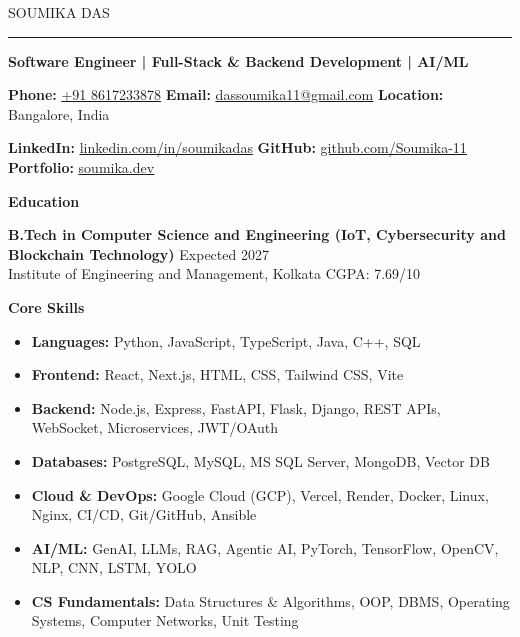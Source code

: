 \documentclass[10pt,a4paper]{article}
\newcommand{\heading}[1]{{\carlito #1}}
\newcommand{\cvsection}[1]{%
  \par\vspace{10pt}%
  {\heading{\color{sectioncolor}\large\bfseries #1}}\par\vspace{2pt}}
\newcommand{\contactlink}[2]{\href{#1}{\color{sectioncolor}\underline{#2}}}
\begin{document}
{\heading{\color{namecolor}\fontsize{22}{26}\selectfont SOUMIKA DAS}}\par
\vspace{1pt}
{\color{rulecolor}\rule{\textwidth}{0.8pt}}\par
\vspace{4pt}

{\bfseries Software Engineer | Full-Stack \& Backend Development | AI/ML}\par
\vspace{3pt}

\textbf{Phone:} \contactlink{tel:+918617233878}{+91 8617233878} \quad
\textbf{Email:} \contactlink{mailto:dassoumika11@gmail.com}{dassoumika11@gmail.com} \quad
\textbf{Location:} Bangalore, India\par
\textbf{LinkedIn:} \contactlink{https://www.linkedin.com/in/soumikadas/}{linkedin.com/in/soumikadas} \quad
\textbf{GitHub:} \contactlink{https://github.com/Soumika-11}{github.com/Soumika-11} \quad
\textbf{Portfolio:} \contactlink{https://www.soumika.dev/}{soumika.dev}\par

\cvsection{Education}
\textbf{B.Tech in Computer Science and Engineering (IoT, Cybersecurity and Blockchain
Technology)} \hfill Expected 2027\\
Institute of Engineering and Management, Kolkata \hfill CGPA: 7.69/10

\cvsection{Core Skills}
\begin{itemize}
  \item \textbf{Languages:} Python, JavaScript, TypeScript, Java, C++, SQL
  \item \textbf{Frontend:} React, Next.js, HTML, CSS, Tailwind CSS, Vite
  \item \textbf{Backend:} Node.js, Express, FastAPI, Flask, Django, REST APIs, WebSocket, Microservices, JWT/OAuth
  \item \textbf{Databases:} PostgreSQL, MySQL, MS SQL Server, MongoDB, Vector DB
  \item \textbf{Cloud \& DevOps:} Google Cloud (GCP), Vercel, Render, Docker, Linux, Nginx, CI/CD, Git/GitHub, Ansible
  \item \textbf{AI/ML:} GenAI, LLMs, RAG, Agentic AI, PyTorch, TensorFlow, OpenCV, NLP, CNN, LSTM, YOLO
  \item \textbf{CS Fundamentals:} Data Structures \& Algorithms, OOP, DBMS, Operating Systems, Computer Networks, Unit Testing
\end{itemize}
\end{document}
